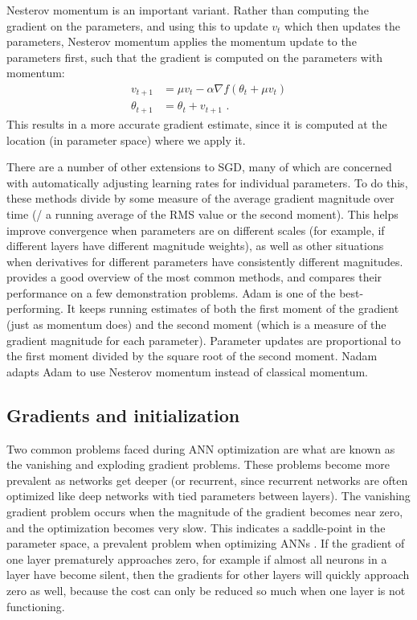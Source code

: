 Nesterov momentum \parencite{Sutskever2013} is an important variant.
Rather than computing the gradient on the parameters,
and using this to update $v_t$ which then updates the parameters,
Nesterov momentum applies the momentum update to the parameters first,
such that the gradient is computed on the parameters with momentum:
\begin{align}
  v_{t+1} &= \mu v_t - \alpha \nabla f(\theta_t + \mu v_t) \\
  \theta_{t+1} &= \theta_t + v_{t+1} \text{ .}
\end{align}
This results in a more accurate gradient estimate,
since it is computed at the location (in parameter space) where we apply it.

There are a number of other extensions to SGD,
many of which are concerned with automatically adjusting learning rates
for individual parameters.
To do this, these methods divide by some measure
of the average gradient magnitude over time
(\eg/ a running average of the RMS value or the second moment).
This helps improve convergence when parameters are on different scales
(for example, if different layers have different magnitude weights),
as well as other situations when derivatives for different parameters
have consistently different magnitudes.
\textcite{Ruder2016} provides a good overview of the most common methods,
and compares their performance on a few demonstration problems.
Adam \parencite{Kingma2015} is one of the best-performing.
It keeps running estimates of both
the first moment of the gradient (just as momentum does)
and the second moment (which is a measure of the gradient magnitude for each parameter).
Parameter updates are proportional to the first moment
divided by the square root of the second moment.
Nadam \parencite{Dozat2016} adapts Adam to use Nesterov momentum
instead of classical momentum.


\subsection{Gradients and initialization}

Two common problems faced during ANN optimization
are what are known as the vanishing and exploding gradient problems.
These problems become more prevalent as networks get deeper
(or recurrent, since recurrent networks are often optimized like deep networks
with tied parameters between layers).
The vanishing gradient problem occurs when the magnitude of the gradient
becomes near zero, and the optimization becomes very slow.
This indicates a saddle-point in the parameter space,
a prevalent problem when optimizing ANNs \parencite{Dauphin2014}.
If the gradient of one layer prematurely approaches zero,
for example if almost all neurons in a layer have become silent,
then the gradients for other layers will quickly approach zero as well,
because the cost can only be reduced so much when one layer is not functioning.

